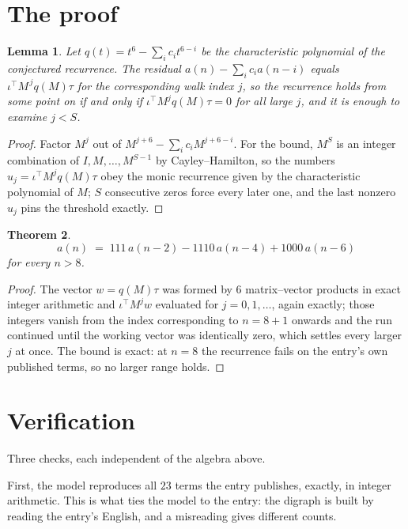 \documentclass[11pt,a4paper]{article}
\theoremstyle{plain}
\newtheorem{theorem}{Theorem}
\newtheorem{lemma}[theorem]{Lemma}
\theoremstyle{definition}
\begin{document}
\section{The proof}

\begin{lemma}\label{lem:crit}
Let $q(t)=t^{6}-\sum_i c_it^{6-i}$ be the characteristic polynomial of the
conjectured recurrence. The residual $a(n)-\sum_ic_ia(n-i)$ equals
$\iota^{\!\top}M^{\,j}q(M)\tau$ for the corresponding walk index $j$, so the recurrence
holds from some point on if and only if $\iota^{\!\top}M^{j}q(M)\tau=0$ for all large $j$,
and it is enough to examine $j<S$.
\end{lemma}

\begin{proof}
Factor $M^{j}$ out of $M^{j+6}-\sum_ic_iM^{j+6-i}$. For the bound, $M^{S}$
is an integer combination of $I,M,\dots,M^{S-1}$ by Cayley--Hamilton, so the numbers
$u_j=\iota^{\!\top}M^{j}q(M)\tau$ obey the monic recurrence given by the characteristic
polynomial of $M$; $S$ consecutive zeros force every later one, and the last nonzero $u_j$
pins the threshold exactly.
\end{proof}

\begin{theorem}
\[
a(n)\;=\;111\,a(n-2) - 1110\,a(n-4) + 1000\,a(n-6)
\]
for every $n>8$.
\end{theorem}

\begin{proof}
The vector $w=q(M)\tau$ was formed by $6$ matrix--vector products in exact integer
arithmetic and $\iota^{\!\top}M^{j}w$ evaluated for $j=0,1,\dots$, again exactly; those
integers vanish from the index corresponding to $n=8+1$ onwards and the run continued
until the working vector was identically zero, which settles every larger $j$ at once. The bound is exact: at $n=8$ the recurrence fails on the entry's own published terms, so no larger range holds.
\end{proof}

\section{Verification}

Three checks, each independent of the algebra above.

First, the model reproduces all $23$ terms the entry publishes, exactly, in integer
arithmetic. This is what ties the model to the entry: the digraph is built by reading the
entry's English, and a misreading gives different counts.
\end{document}
